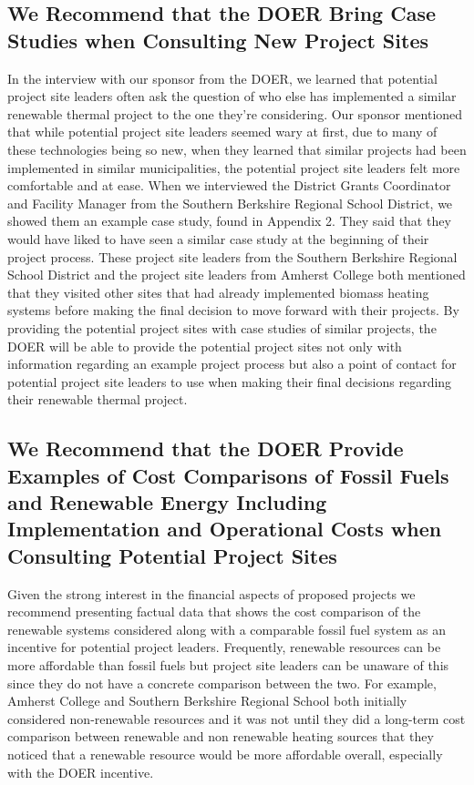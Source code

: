\subsection{We Recommend that the DOER Bring Case Studies when Consulting New Project Sites}
\par In the interview with our sponsor from the DOER, we learned that potential project site leaders often ask the question of who else has implemented a similar renewable thermal project to the one they’re considering. Our sponsor mentioned that while potential project site leaders seemed wary at first, due to many of these technologies being so new, when they learned that similar projects had been implemented in similar municipalities, the potential project site leaders felt more comfortable and at ease. When we interviewed the District Grants Coordinator and Facility Manager from the Southern Berkshire Regional School District, we showed them an example case study, found in Appendix 2. They said that they would have liked to have seen a similar case study at the beginning of their project process. These project site leaders from the Southern Berkshire Regional School District and the project site leaders from Amherst College both mentioned that they visited other sites that had already implemented biomass heating systems before making the final decision to move forward with their projects. By providing the potential project sites with case studies of similar projects, the DOER will be able to provide the potential project sites not only with information regarding an example project process but also a point of contact for potential project site leaders to use when making their final decisions regarding their renewable thermal project.

\subsection{We Recommend that the DOER Provide Examples of Cost Comparisons of Fossil Fuels and Renewable Energy Including Implementation and Operational Costs when Consulting Potential Project Sites}
\par Given the strong interest in the financial aspects of proposed projects we recommend presenting factual data that shows the cost comparison of the renewable systems considered along with a comparable fossil fuel system as an incentive for potential project leaders. Frequently, renewable resources can be more affordable than fossil fuels but project site leaders can be unaware of this since they do not have a concrete comparison between the two. For example, Amherst College and Southern Berkshire Regional School both initially considered non-renewable resources and it was not until they did a long-term cost comparison between renewable and non renewable heating sources that they noticed that a renewable resource would be more affordable overall, especially with the DOER incentive. 

